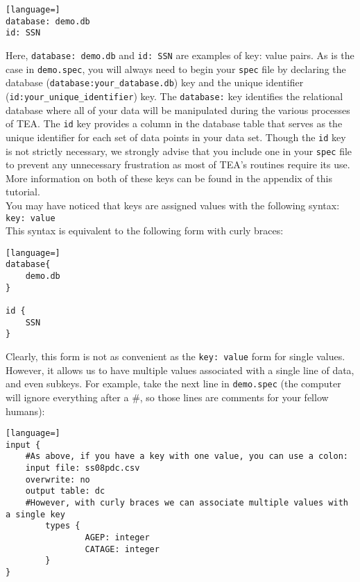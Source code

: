 \documentclass{article}
\begin{document}
\begin{lstlisting}[language=]
database: demo.db
id: SSN
\end{lstlisting}

Here, {\tt database: demo.db} and {\tt id: SSN} are examples of key: value pairs.
As is the case in {\tt demo.spec}, you will always need to begin your {\tt spec} file by declaring the 
database ({\tt database:your\_database.db}) key and the unique identifier 
({\tt id:your\_unique\_identifier}) key. The {\tt database:} key identifies 
the relational database where all of your data will be manipulated during the various processes of TEA. 
The {\tt id} key provides a column in the database table that serves as the unique identifier for 
each set of data points in your data set. Though the {\tt id} key is not strictly necessary, 
we strongly advise that you include one in your {\tt spec} file to prevent any unnecessary frustration 
as most of TEA's routines require its use. More information on both of these keys can be found in 
the appendix of this tutorial.\\

You may have noticed that keys are assigned values with the following syntax:\\

{\tt key: value}\\

This syntax is equivalent to the following form with curly braces:
\begin{lstlisting}[language=]
database{
	demo.db
}

id {
	SSN
}
\end{lstlisting}

Clearly, this form is not as convenient as the {\tt key: value} form for single values. However, it allows 
us to have multiple values associated with a single line of data, and even subkeys. For example, take  
the next line in {\tt demo.spec} (the computer will 
ignore everything after a \#, so those lines are comments for your fellow humans):

\begin{lstlisting}[language=]
input {
    #As above, if you have a key with one value, you can use a colon:
    input file: ss08pdc.csv
    overwrite: no
    output table: dc
	#However, with curly braces we can associate multiple values with a single key
        types {
                AGEP: integer
                CATAGE: integer
        }
}
\end{lstlisting}

\end{document}
